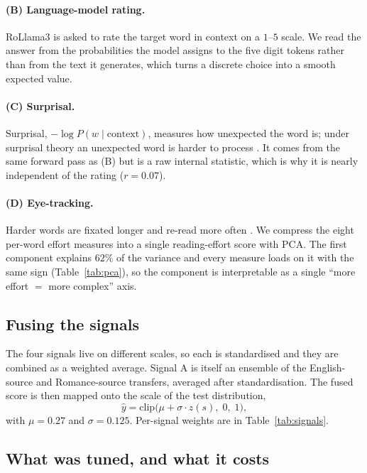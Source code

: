 \paragraph{(B) Language-model rating.}
RoLlama3 is asked to rate the target word in context on a $1$--$5$
scale. We read the answer from the probabilities the model assigns to
the five digit tokens rather than from the text it generates, which
turns a discrete choice into a smooth expected value.

\paragraph{(C) Surprisal.}
Surprisal, $-\log P(w \mid \mathrm{context})$, measures how unexpected
the word is; under surprisal theory an unexpected word is harder to
process \citep{hale2001probabilistic}. It comes from the same forward
pass as (B) but is a raw internal statistic, which is why it is nearly
independent of the rating ($r = 0.07$).

\paragraph{(D) Eye-tracking.}
Harder words are fixated longer and re-read more often
\citep{rayner1998eye}. We compress the eight per-word effort measures
into a single reading-effort score with PCA. The first component
explains $62\%$ of the variance and every measure loads on it with the
same sign (Table~\ref{tab:pca}), so the component is interpretable as a
single ``more effort $=$ more complex'' axis.

\subsection{Fusing the signals}

The four signals live on different scales, so each is standardised and
they are combined as a weighted average. Signal A is itself an ensemble
of the English-source and Romance-source transfers, averaged after
standardisation. The fused score is then mapped onto the scale of the
test distribution,
\begin{equation}
  \label{eq:calib}
  \hat{y} = \mathrm{clip}\bigl(\mu + \sigma \cdot z(s),\; 0,\; 1\bigr),
\end{equation}
with $\mu = 0.27$ and $\sigma = 0.125$. Per-signal weights are in
Table~\ref{tab:signals}.

\subsection{What was tuned, and what it costs}
\label{sec:tuning}

